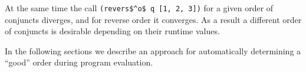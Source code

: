 
At the same time the call \lstinline{(revers$^o$ q [1, 2, 3])} for a given order of conjuncts diverges, and for reverse order it converges. As a result a
different order of conjuncts is desirable depending on their runtime values.

In the following sections we describe an approach for automatically determining a ``good'' order during program evaluation.
